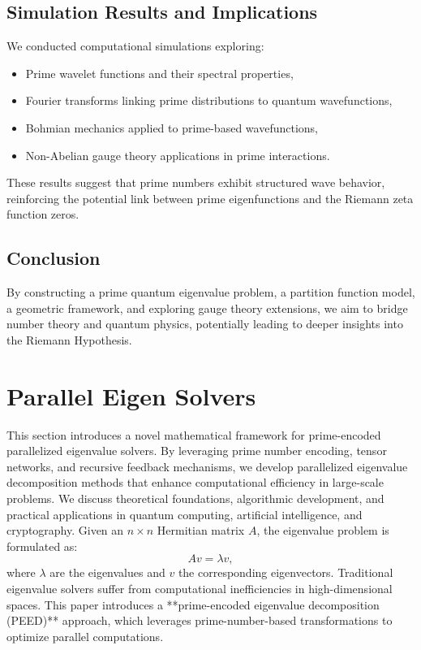 \documentclass{article}
\theoremstyle{plain}
\theoremstyle{plain}
\theoremstyle{definition}
\theoremstyle{remark}
\begin{document}
\subsection{Simulation Results and Implications}
We conducted computational simulations exploring:
\begin{itemize}
\item Prime wavelet functions and their spectral properties,
\item Fourier transforms linking prime distributions to quantum wavefunctions,
\item Bohmian mechanics applied to prime-based wavefunctions,
\item Non-Abelian gauge theory applications in prime interactions.
\end{itemize}
These results suggest that prime numbers exhibit structured wave behavior, reinforcing the potential link between prime eigenfunctions and the Riemann zeta function zeros.

\subsection{Conclusion}
By constructing a prime quantum eigenvalue problem, a partition function model, a geometric framework, and exploring gauge theory extensions, we aim to bridge number theory and quantum physics, potentially leading to deeper insights into the Riemann Hypothesis.

\section{Parallel Eigen Solvers}
This section introduces a novel mathematical framework for prime-encoded parallelized eigenvalue solvers. 
By leveraging prime number encoding, tensor networks, and recursive feedback mechanisms, we develop 
parallelized eigenvalue decomposition methods that enhance computational efficiency in large-scale 
problems. We discuss theoretical foundations, algorithmic development, and practical applications 
in quantum computing, artificial intelligence, and cryptography.
Given an $n \times n$ Hermitian matrix $A$, the eigenvalue problem is formulated as:
\begin{equation}
    A v = \lambda v,
\end{equation}
where $\lambda$ are the eigenvalues and $v$ the corresponding eigenvectors. Traditional eigenvalue solvers suffer 
from computational inefficiencies in high-dimensional spaces. 
This paper introduces a **prime-encoded eigenvalue decomposition (PEED)** approach, 
which leverages prime-number-based transformations to optimize parallel computations.
\end{document}
